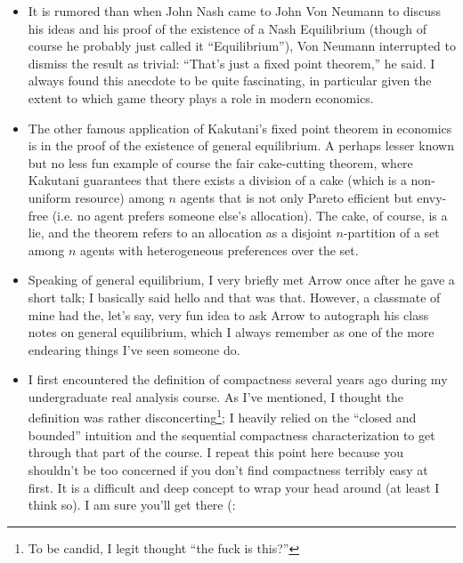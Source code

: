 \documentclass{article}
\begin{document}
\begin{itemize}[label=$\bullet$]
  \item It is rumored than when John Nash came to John Von Neumann to discuss his ideas and his proof of the existence of a Nash Equilibrium (though of course he probably just called it ``Equilibrium''), Von Neumann interrupted to dismiss the result as trivial: ``That's just a fixed point theorem,'' he said. I always found this anecdote to be quite fascinating, in particular given the extent to which game theory plays a role in modern economics.

  \item The other famous application of Kakutani's fixed point theorem in economics is in the proof of the existence of general equilibrium. A perhaps lesser known but no less fun example of course the fair cake-cutting theorem, where Kakutani guarantees that there exists a division of a cake (which is a non-uniform resource) among $n$ agents that is not only Pareto efficient but envy-free (i.e. no agent prefers someone else's allocation). The cake, of course, is a lie, and the theorem refers to an allocation as a disjoint $n$-partition of a set among $n$ agents with heterogeneous preferences over the set.

  \item Speaking of general equilibrium, I very briefly met Arrow once after he gave a short talk; I basically said hello and that was that. However, a classmate of mine had the, let's say, very fun idea to ask Arrow to autograph his class notes on general equilibrium, which I always remember as one of the more endearing things I've seen someone do.

  \item I first encountered the definition of compactness several years ago during my undergraduate real analysis course. As I've mentioned, I thought the definition was rather disconcerting\footnote{To be candid, I legit thought ``the fuck is this?''}; I heavily relied on the ``closed and bounded'' intuition and the sequential compactness characterization to get through that part of the course. I repeat this point here because you shouldn't be too concerned if you don't find compactness terribly easy at first. It is a difficult and deep concept to wrap your head around (at least I think so). I am sure you'll get there (:
\end{itemize}

\clearpage

\setcounter{subsection}{0}
\renewcommand\thesubsection{\Alph{subsection}}
\titleformat{\subsection}[display]{
  \Large\bfseries
}{Appendix \thesubsection. #1}{0pt}{\vspace{-24pt}}
\renewcommand\thesubsubsection{\Alph{subsection}.\arabic{subsubsection}}
\end{document}
